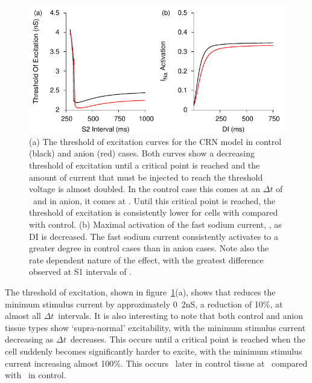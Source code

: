 \begin{figure}
\begin{center}
\includegraphics{figures/toolkit/anion/figures/04_ToE}
\end{center}
\caption[Anion Sensitive Threshold Of Excitation and  activation]{
\label{fig:toolkit:anion:toe}
(a)
The threshold of excitation curves for the CRN model in control (black) and
anion (red) cases.
Both curves show a decreasing threshold of excitation until a critical point is
reached and the amount of current that must be injected to reach the threshold
voltage is almost doubled.  In the control case this comes at an $\Delta t$ of
\ and in anion, it comes at .
Until this critical point is reached, the threshold of excitation is
consistently lower for cells with  compared with control.
(b)
Maximal activation of the fast sodium current, , as DI is decreased.
The fast sodium current consistently activates to a
greater degree in control cases than in anion cases.
Note also the rate
dependent nature of the effect, with the greatest difference observed at S1
intervals of .
}
\end{figure}


The threshold of excitation, shown in figure~\ref{fig:toolkit:anion:toe}(a), shows that
 reduces the minimum stimulus current by approximately \unit{0.2}{nS},
a reduction of 10\%, at almost all $\Delta t$\ intervals.  It is also
interesting to note that both control and anion tissue types show `supra-normal'
excitability, with the minimum stimulus current decreasing as $\Delta t$\
decreases.  This occurs until a critical point is reached when the cell suddenly
becomes significantly harder to excite, with the minimum stimulus current
increasing almost 100\%.
This occurs \ later in control tissue at
\, compared with \ in control.

